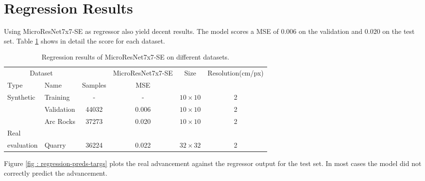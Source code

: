 \documentclass[../document.tex]{subfiles}
\begin{document}
\section{Regression Results}
Using MicroResNet7x7-SE as regressor also yield decent results. The model scores a MSE of $0.006$ on the validation and $0.020$ on the test set. Table \ref{tab : regression-results} shows in detail the score for each dataset.
\begin{table}[htbp]
    \centering
    \begin{tabular}{@{}llcccc@{}}
    \toprule
    \multicolumn{2}{c}{Dataset} & & \multicolumn{1}{c}{MicroResNet7x7-SE} & Size & Resolution(cm/px) \\
    \cmidrule{1-2} \cmidrule{4-5}
    Type     &  Name  & Samples & MSE      & \\
    \toprule
      \multirow{3}{*}{Synthetic}  & Training  &  - & - &$10\times10$  & 2\\
      &  Validation   & 44032 &  0.006  &  $10\times10$ & 2 \\
      & Arc Rocks & 37273 & 0.020  &  $10\times10$& 2 \\
      \cmidrule{2-6}
    Real\\evaluation & Quarry & 36224 &  0.022 & $32\times32$ & 2\\
    \bottomrule   
\end{tabular}
\caption{Regression results of MicroResNet7x7-SE on different datasets.}
\label{tab : regression-results}
\end{table}
Figure \ref{fig : regression-preds-targs} plots the real advancement against the regressor output for the test set. In most cases the model did not correctly predict the advancement.
\end{document}
